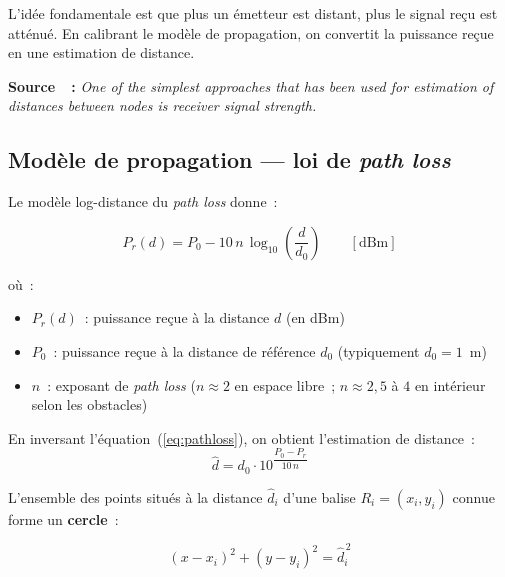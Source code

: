 \documentclass[12pt, a4paper]{article}
\begin{document}
L'idée fondamentale est que plus un émetteur est distant, plus le signal reçu est
atténué. En calibrant le modèle de propagation, on convertit la puissance reçue en
une estimation de distance.

\begin{citebox}
\textbf{Source~\cite{Xiao2016}~:} \og{}\textit{One of the simplest approaches that
has been used for estimation of distances between nodes is receiver signal
strength.}\fg{}
\end{citebox}

\subsection{Modèle de propagation — loi de \textit{path loss}}

Le modèle log-distance du \textit{path loss} donne~:

\begin{keybox}
\begin{equation}
  P_r(d) = P_0 - 10\,n\,\log_{10}\!\left(\frac{d}{d_0}\right) \qquad [\text{dBm}]
  \label{eq:pathloss}
\end{equation}
\end{keybox}

\noindent où~:
\begin{itemize}
  \item $P_r(d)$~: puissance reçue à la distance $d$ (en dBm)
  \item $P_0$~: puissance reçue à la distance de référence $d_0$ (typiquement
        $d_0 = 1$~m)
  \item $n$~: exposant de \textit{path loss} ($n \approx 2$ en espace libre~;
        $n \approx 2{,}5$ à $4$ en intérieur selon les obstacles)
\end{itemize}

En inversant l'équation~(\ref{eq:pathloss}), on obtient l'estimation de distance~:
\begin{equation}
  \hat{d} = d_0 \cdot 10^{\dfrac{P_0 - P_r}{10\,n}}
  \label{eq:dist_rssi}
\end{equation}

L'ensemble des points situés à la distance $\hat{d}_i$ d'une balise $R_i = (x_i, y_i)$
connue forme un \textbf{cercle}~:

\begin{keybox}
\begin{equation}
  (x - x_i)^2 + (y - y_i)^2 = \hat{d}_i^{\,2}
  \label{eq:cercle}
\end{equation}
\end{keybox}
\end{document}

